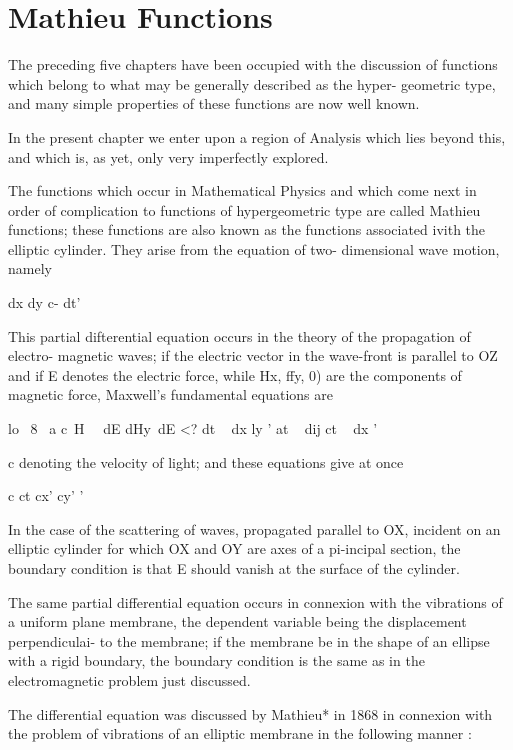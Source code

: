 %
%
\chapter{Mathieu Functions} 

The preceding five chapters have been occupied with the discussion of
functions which belong to what may be generally described as the
hyper- geometric type, and many simple properties of these functions
are now well known.

In the present chapter we enter upon a region of Analysis which lies
beyond this, and which is, as yet, only very imperfectly explored.

The functions which occur in Mathematical Physics and which come next
in order of complication to functions of hypergeometric type are
called Mathieu functions; these functions are also known as the
functions associated ivith the elliptic cylinder. They arise from the
equation of two- dimensional wave motion, namely

dx dy c- dt'

This partial difterential equation occurs in the theory of the
propagation of electro- magnetic waves; if the electric vector in the
wave-front is parallel to OZ and if E denotes the electric force,
while Hx, ffy, 0) are the components of magnetic force, Maxwell's
fundamental equations are

lo \ 8 \ a c\ H \ \ dE dHy\ dE <? dt ~ dx ly ' at ~ dij ct ~ dx '

c denoting the velocity of light; and these equations give at once

c ct cx' cy' '

In the case of the scattering of waves, propagated parallel to OX,
incident on an elliptic cylinder for which OX and OY are axes of a
pi-incipal section, the boundary condition is that E should vanish at
the surface of the cylinder.

The same partial differential equation occurs in connexion with the
vibrations of a uniform plane membrane, the dependent variable being
the displacement perpendiculai- to the membrane; if the membrane be
in the shape of an ellipse with a rigid boundary, the boundary
condition is the same as in the electromagnetic problem just
discussed.

The differential equation was discussed by Mathieu* in 1868 in
connexion with the problem of vibrations of an elliptic membrane in
the following manner :

